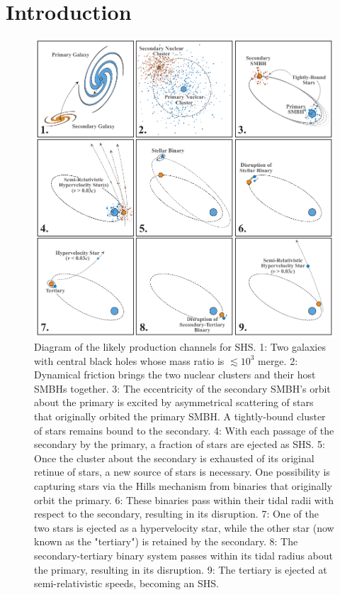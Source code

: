 \documentclass[a4paper,twocolumn]{emulateapj}
\begin{document}
\section{Introduction}

\begin{figure}
\centering\includegraphics[width=0.8\linewidth,clip=true]{shs-diagram}
\caption{Diagram of the likely production channels for SHS. 1: Two galaxies with central black holes whose mass ratio is $\lesssim 10^3$ merge. 2: Dynamical friction brings the two nuclear clusters and their host SMBHs together. 3: The eccentricity of the secondary SMBH's orbit about the primary is excited by asymmetrical scattering of stars that originally orbited the primary SMBH. A tightly-bound cluster of stars remains bound to the secondary. 4: With each passage of the secondary by the primary, a fraction of stars are ejected as SHS. 5: Once the cluster about the secondary is exhausted of its original retinue of stars, a new source of stars is necessary. One possibility is capturing stars via the Hills mechanism from binaries that originally orbit the primary. 6: These binaries pass within their tidal radii with respect to the secondary, resulting in its disruption. 7: One of the two stars is ejected as a hypervelocity star, while the other star (now known as the "tertiary") is retained by the secondary. 8: The secondary-tertiary binary system passes within its tidal radius about the primary, resulting in its disruption. 9: The tertiary is ejected at semi-relativistic speeds, becoming an SHS.}
\label{fig:diagram}
\end{figure}
\end{document}
